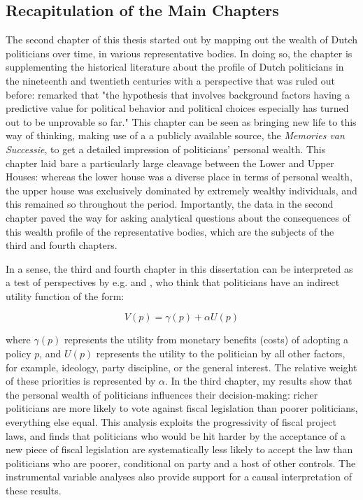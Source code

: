 \subsection{Recapitulation of the Main Chapters}\label{sec:recap}
The second chapter of this thesis started out by mapping out the wealth of Dutch politicians over time, in various representative bodies. In doing so, the chapter is supplementing the historical literature about the profile of Dutch politicians in the nineteenth and twentieth centuries \citep{van1983toegang, secker1991ministers, van1999eerste, oomen2020werk} with a perspective that was ruled out before: \cite{van1983toegang} remarked that "the hypothesis that involves background factors having a predictive value for political behavior and political choices especially has turned out to be unprovable so far." This chapter can be seen as bringing new life to this way of thinking, making use of a a publicly available source, the \textit{Memories van Successie}, to get a detailed impression of politicians' personal wealth. This chapter laid bare a particularly large cleavage between the Lower and Upper Houses: whereas the lower house was a diverse place in terms of personal wealth, the upper house was exclusively dominated by extremely wealthy individuals, and this remained so throughout the period. Importantly, the data in the second chapter paved the way for asking analytical questions about the consequences of this wealth profile of the representative bodies, which are the subjects of the third and fourth chapters. 

In a sense, the third and fourth chapter in this dissertation can be interpreted as a test of perspectives by e.g. \cite{tahoun2019personal} and \cite{grossman1996electoral}, who think that politicians have an indirect utility function of the form:

\begin{equation}\label{eq:utility}
    V(p) = \gamma (p) + \alpha U (p)
\end{equation}

where $\gamma (p)$ represents the utility from monetary benefits (costs) of adopting a policy $p$, and $U (p)$ represents the utility to the politician by all other factors, for example, ideology, party discipline, or the general interest. The relative weight of these priorities is represented by $\alpha$. In the third chapter, my results show that the personal wealth of politicians influences their decision-making: richer politicians are more likely to vote against fiscal legislation than poorer politicians, everything else equal. This analysis exploits the progressivity of fiscal project laws, and finds that politicians who would be hit harder by the acceptance of a new piece of fiscal legislation are systematically less likely to accept the law than politicians who are poorer, conditional on party and a host of other controls. The instrumental variable analyses also provide support for a causal interpretation of these results. 

